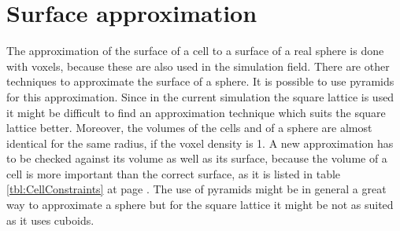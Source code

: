 \section{Surface approximation}
The approximation of the surface of a cell to a surface of a real sphere is done with voxels, because these are also used in the simulation field. There are other techniques to approximate the surface of a sphere. It is possible to use pyramids for this approximation. Since in the current simulation the square lattice is used it might be difficult to find an approximation technique which suits the square lattice better. Moreover, the volumes of the cells and of a sphere are almost identical for the same radius, if the voxel density is 1. A new approximation has to be checked against its volume as well as its surface, because the volume of a cell is more important than the correct surface, as it is listed in table \ref{tbl:CellConstraints} at page \pageref{tbl:CellConstraints}. The use of pyramids might be in general a great way to approximate a sphere but for the square lattice it might be not as suited as it uses cuboids.

